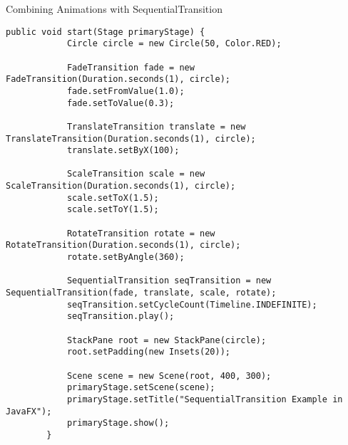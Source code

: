 \documentclass[aspectratio=169, table]{beamer}
\begin{document}
\begin{frame}[fragile]{\LARGE{Combining Animations with SequentialTransition}}
	\vspace{25pt}
	\begin{lstlisting}[style=JavaStyle]
		public void start(Stage primaryStage) {
			Circle circle = new Circle(50, Color.RED);
			
			FadeTransition fade = new FadeTransition(Duration.seconds(1), circle);
			fade.setFromValue(1.0);
			fade.setToValue(0.3);
			
			TranslateTransition translate = new TranslateTransition(Duration.seconds(1), circle);
			translate.setByX(100);
			
			ScaleTransition scale = new ScaleTransition(Duration.seconds(1), circle);
			scale.setToX(1.5);
			scale.setToY(1.5);
			
			RotateTransition rotate = new RotateTransition(Duration.seconds(1), circle);
			rotate.setByAngle(360);
			
			SequentialTransition seqTransition = new SequentialTransition(fade, translate, scale, rotate);
			seqTransition.setCycleCount(Timeline.INDEFINITE);
			seqTransition.play();
			
			StackPane root = new StackPane(circle);
			root.setPadding(new Insets(20));
			
			Scene scene = new Scene(root, 400, 300);
			primaryStage.setScene(scene);
			primaryStage.setTitle("SequentialTransition Example in JavaFX");
			primaryStage.show();
		}
	\end{lstlisting}
\end{frame}
\end{document}
